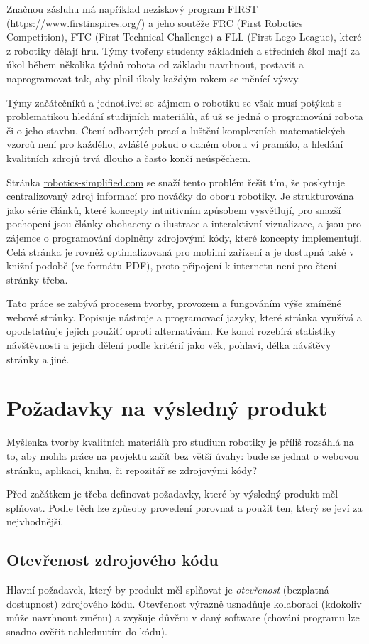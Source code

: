 \documentclass[a4paper, 12pt]{article}
\begin{document}
  Značnou zásluhu má například neziskový program FIRST (https://www.firstinspires.org/) a jeho soutěže FRC (First Robotics Competition), FTC (First Technical Challenge) a FLL (First Lego League), které z robotiky dělají hru. Týmy tvořeny studenty základních a středních škol mají za úkol během několika týdnů robota od základu navrhnout, postavit a naprogramovat tak, aby plnil úkoly každým rokem se měnící výzvy.

  Týmy začátečníků a jednotlivci se zájmem o robotiku se však musí potýkat s problematikou hledání studijních materiálů, ať už se jedná o programování robota či o jeho stavbu. Čtení odborných prací a luštění komplexních matematických vzorců není pro každého, zvláště pokud o daném oboru ví pramálo, a hledání kvalitních zdrojů trvá dlouho a často končí neúspěchem.

  Stránka \url{robotics-simplified.com} se snaží tento problém řešit tím, že poskytuje centralizovaný zdroj informací pro nováčky do oboru robotiky. Je strukturována jako série článků, které koncepty intuitivním způsobem vysvětlují, pro snazší pochopení jsou články obohaceny o ilustrace a interaktivní vizualizace, a jsou pro zájemce o programování doplněny zdrojovými kódy, které koncepty implementují. Celá stránka je rovněž optimalizovaná pro mobilní zařízení a je dostupná také v knižní podobě (ve formátu PDF), proto připojení k internetu není pro čtení stránky třeba.

  Tato práce se zabývá procesem tvorby, provozem a fungováním výše zmíněné webové stránky. Popisuje nástroje a programovací jazyky, které stránka využívá a opodstatňuje jejich použití oproti alternativám. Ke konci rozebírá statistiky návštěvnosti a jejich dělení podle kritérií jako věk, pohlaví, délka návštěvy stránky a jiné.

  \newpage

  \section{Požadavky na výsledný produkt}
  Myšlenka tvorby kvalitních materiálů pro studium robotiky je příliš rozsáhlá na to, aby mohla práce na projektu začít bez větší úvahy: bude se jednat o webovou stránku, aplikaci, knihu, či repozitář se zdrojovými kódy?

  Před začátkem je třeba definovat požadavky, které by výsledný produkt měl splňovat. Podle těch lze způsoby provedení porovnat a použít ten, který se jeví za nejvhodnější.


  \subsection{Otevřenost zdrojového kódu}
  Hlavní požadavek, který by produkt měl splňovat je \emph{otevřenost} (bezplatná dostupnost) zdrojového kódu. Otevřenost výrazně usnadňuje kolaboraci (kdokoliv může navrhnout změnu) a zvyšuje důvěru v daný software (chování programu lze snadno ověřit nahlednutím do kódu).
\end{document}
